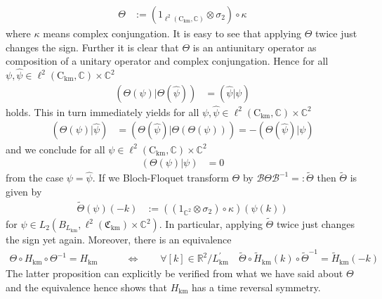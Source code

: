 \begin{align*}
  \Theta
  &:=
  \left(
    1_{\ell^{2}(\mathrm{C}_{\textrm{km}},\mathbb{C})}
    \otimes
    \sigma_{2}
  \right)
  \circ
  \kappa
\end{align*}
where $\kappa$ means complex conjungation. It is easy to see that applying $\Theta$ twice just changes the sign. Further it is clear that $\Theta$ is an antiunitary operator as composition of a unitary operator and complex conjungation. Hence for all $\psi,\hat{\psi} \in \ell^{2}(\mathrm{C}_{\textrm{km}},\mathbb{C}) \times \mathbb{C}^{2}$
\begin{align*}
  (\Theta(\psi) \vert \Theta(\hat{\psi}))
  &=
(\hat{\psi} \vert \psi)\end{align*}
holds. This in turn immediately yields for all $\psi,\hat{\psi} \in \ell^{2}(\mathrm{C}_{\textrm{km}},\mathbb{C}) \times \mathbb{C}^{2}$
\begin{align*}
  (\Theta(\psi) \vert \hat{\psi})
  &=
  (\Theta(\hat{\psi}) \vert \Theta(\Theta(\psi)))
  =
  -
  (\Theta(\hat{\psi}) \vert \psi)
\end{align*}
and we conclude for all $\psi \in \ell^{2}(\mathrm{C}_{\textrm{km}},\mathbb{C}) \times \mathbb{C}^{2}$
\begin{align*}
  (\Theta(\psi) \vert \psi)
  &=
  0
\end{align*}
from the case $\psi = \hat{\psi}$. If we Bloch-Floquet transform $\Theta$ by $\mathcal{B}\Theta\mathcal{B}^{-1} =: \tilde{\Theta}$ then $\tilde{\Theta}$ is given by
\begin{align*}
  \tilde{\Theta}(\psi)(-k)
  &:=
  \left(
    \left(
      1_{\mathbb{C}^{2}}
      \otimes
      \sigma_{2}
    \right)
    \circ
    \kappa
  \right)
  (\psi(k))
\end{align*}
for $\psi \in  L_{2}(B_{L_{\textrm{km}}},\ell^{2}(\mathfrak{C}_{\textrm{km}}) \times \mathbb{C}^{2})$. In particular, applying $\tilde{\Theta}$ twice just changes the sign yet again. Moreover, there is an equivalence
\begin{align*}
  \Theta
  \circ
  H_{\textrm{km}}
  \circ
  \Theta^{-1}
  =
  H_{\textrm{km}}
  \qquad
  &\Leftrightarrow
  \qquad
  \forall
  [k]
  \in
  \mathbb{R}^{2}/L_{\textrm{km}}^{\prime}
  \quad
  \tilde{\Theta}
  \circ
  \tilde{H}_{\textrm{km}}(k)
  \circ
  \tilde{\Theta}^{-1}
  =
  \tilde{H}_{\textrm{km}}(-k)
\end{align*}
The latter proposition can explicitly be verified from what we have said about $\Theta$ and the equivalence hence shows that $H_{\textrm{km}}$ has a time reversal symmetry.
